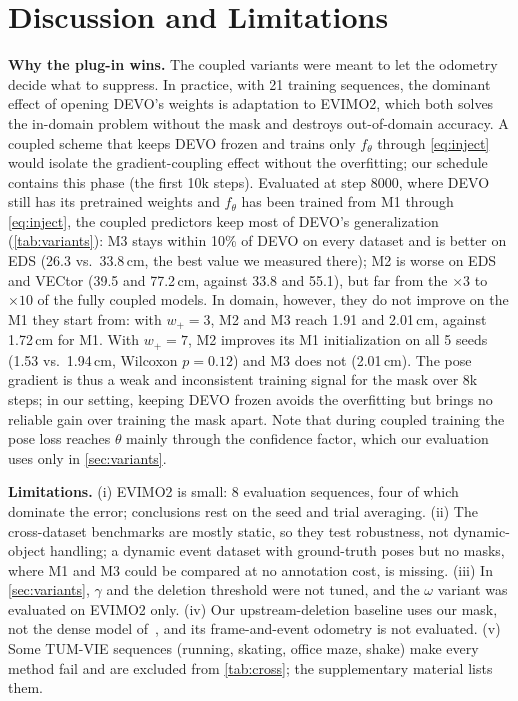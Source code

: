 \documentclass[conference]{IEEEtran}
\newcommand{\wplus}{w_{+}}
\begin{document}
\section{Discussion and Limitations}

\textbf{Why the plug-in wins.} The coupled variants were meant to let the odometry decide
what to suppress. In practice, with 21 training sequences, the dominant effect of opening
DEVO's weights is adaptation to EVIMO2, which both solves the in-domain problem without
the mask and destroys out-of-domain accuracy. A coupled scheme that keeps DEVO frozen and
trains only $f_\theta$ through \cref{eq:inject} would isolate the gradient-coupling effect
without the overfitting; our schedule contains this phase (the first 10k steps). Evaluated
at step 8000, where DEVO still has its pretrained weights and $f_\theta$ has been trained
from M1 through \cref{eq:inject}, the coupled predictors keep most of DEVO's generalization
(\cref{tab:variants}): M3 stays within 10\% of DEVO on every dataset and is better on EDS
(26.3 vs.\ 33.8\,cm, the best value we measured there); M2 is worse on EDS and VECtor
(39.5 and 77.2\,cm, against 33.8 and 55.1), but far from the $\times 3$ to $\times 10$ of
the fully coupled models. In domain, however, they do not improve on the M1 they start
from: with $\wplus = 3$, M2 and M3 reach 1.91 and 2.01\,cm, against 1.72\,cm for M1. With
$\wplus = 7$, M2 improves its M1 initialization on all 5 seeds (1.53 vs.\ 1.94\,cm,
Wilcoxon $p = 0.12$) and M3 does not (2.01\,cm). The pose gradient is thus a weak and
inconsistent training signal for the mask over 8k steps; in our setting, keeping DEVO
frozen avoids the overfitting but brings no reliable gain over training the mask apart.
Note that during coupled training the pose loss reaches $\theta$ mainly through the
confidence factor, which our evaluation uses only in \cref{sec:variants}.

\textbf{Limitations.} (i) EVIMO2 is small: 8 evaluation sequences, four of which dominate
the error; conclusions rest on the seed and trial averaging. (ii) The cross-dataset
benchmarks are mostly static, so they test robustness, not dynamic-object handling; a
dynamic event dataset with ground-truth poses but no masks, where M1 and M3 could be
compared at no annotation cost, is missing. (iii) In \cref{sec:variants}, $\gamma$ and the
deletion threshold were not tuned, and the $\omega$ variant was evaluated on EVIMO2 only.
(iv) Our upstream-deletion baseline uses our mask, not the dense model
of~\cite{pellerito2026suppression}, and its frame-and-event odometry is not evaluated.
(v) Some TUM-VIE sequences (running, skating, office maze, shake) make every method fail
and are excluded from \cref{tab:cross}; the supplementary material lists them.
\end{document}
